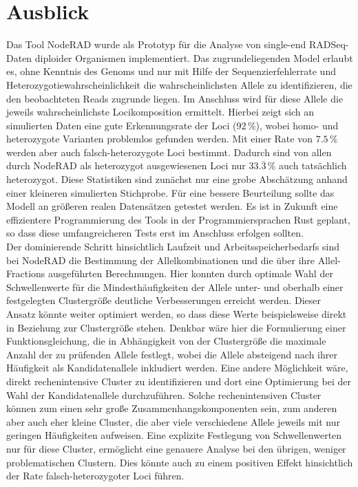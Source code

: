 \chapter{Ausblick} \label{sec:ausblick}

Das Tool NodeRAD wurde als Prototyp für die Analyse von single-end RADSeq-Daten diploider Organismen implementiert. Das zugrundeliegenden Model erlaubt es, ohne Kenntnis des Genoms und nur mit Hilfe der Sequenzierfehlerrate und Heterozygotiewahrscheinlichkeit die wahrscheinlichsten Allele zu identifizieren, die den beobachteten Reads zugrunde liegen. Im Anschluss wird für diese Allele die jeweils wahrscheinlichste Locikomposition ermittelt. Hierbei zeigt sich an simulierten Daten eine gute Erkennungsrate der Loci ($ 92\, \% $), wobei homo- und heterozygote Varianten problemlos gefunden werden. Mit einer Rate von $ 7.5\, \% $ werden aber auch falsch-heterozygote Loci bestimmt. Dadurch sind von allen durch NodeRAD als heterozygot ausgewiesenen Loci nur $ 33.\overline{3}\, \% $ auch tatsächlich heterozygot. Diese Statistiken sind zunächst nur eine grobe Abschätzung anhand einer kleineren simulierten Stichprobe. Für eine bessere Beurteilung sollte das Modell an größeren realen Datensätzen getestet werden. Es ist in Zukunft eine effizientere Programmierung des Tools in der Programmiersprachen Rust geplant, so dass diese umfangreicheren Tests erst im Anschluss erfolgen sollten. \\

Der dominierende Schritt hinsichtlich Laufzeit und Arbeitsspeicherbedarfs sind bei NodeRAD die Bestimmung der Allelkombinationen und die über ihre Allel-Fractions ausgeführten Berechnungen. Hier konnten durch optimale Wahl der Schwellenwerte für die Mindesthäufigkeiten der Allele unter- und oberhalb einer festgelegten Clustergröße deutliche Verbesserungen erreicht werden. Dieser Ansatz könnte weiter optimiert werden, so dass diese Werte beispielsweise direkt in Beziehung zur Clustergröße stehen. Denkbar wäre hier die Formulierung einer Funktionsgleichung, die in Abhängigkeit von der Clustergröße die maximale Anzahl der zu prüfenden Allele festlegt, wobei die Allele absteigend nach ihrer Häufigkeit als Kandidatenallele inkludiert werden. Eine andere Möglichkeit wäre, direkt rechenintensive Cluster zu identifizieren und dort eine Optimierung bei der Wahl der Kandidatenallele durchzuführen. Solche rechenintensiven Cluster können zum einen sehr große Zusammenhangskomponenten sein, zum anderen aber auch eher kleine Cluster, die aber viele verschiedene Allele jeweils mit nur geringen Häufigkeiten aufweisen. Eine explizite Festlegung von Schwellenwerten nur für diese Cluster, ermöglicht eine genauere Analyse bei den übrigen, weniger problematischen Clustern. Dies könnte auch zu einem positiven Effekt hinsichtlich der Rate falsch-heterozygoter Loci führen. \\

